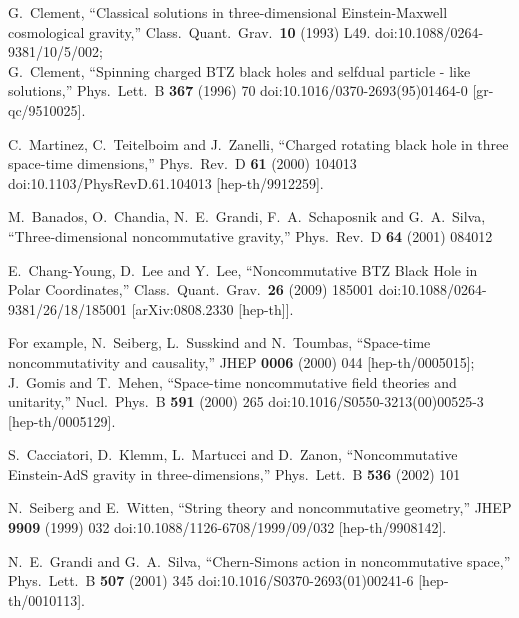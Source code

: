 \documentclass[11pt]{article}
\numberwithin{equation}{section}
\begin{document}
\begin{thebibliography}{99}
  G.~Clement,
  ``Classical solutions in three-dimensional Einstein-Maxwell cosmological gravity,''
  Class.\ Quant.\ Grav.\  {\bf 10} (1993) L49.
  doi:10.1088/0264-9381/10/5/002;\\
  G.~Clement,
  ``Spinning charged BTZ black holes and selfdual particle - like solutions,''
  Phys.\ Lett.\ B {\bf 367} (1996) 70
  doi:10.1016/0370-2693(95)01464-0
  [gr-qc/9510025].


  C.~Martinez, C.~Teitelboim and J.~Zanelli,
  ``Charged rotating black hole in three space-time dimensions,''
  Phys.\ Rev.\ D {\bf 61} (2000) 104013
  doi:10.1103/PhysRevD.61.104013
  [hep-th/9912259].

  M.~Banados, O.~Chandia, N.~E.~Grandi, F.~A.~Schaposnik and G.~A.~Silva,
  ``Three-dimensional noncommutative gravity,''
  Phys.\ Rev.\ D {\bf 64} (2001) 084012

  E.~Chang-Young, D.~Lee and Y.~Lee,
 ``Noncommutative BTZ Black Hole in Polar Coordinates,''
  Class.\ Quant.\ Grav.\  {\bf 26} (2009) 185001
  doi:10.1088/0264-9381/26/18/185001
  [arXiv:0808.2330 [hep-th]].

For example,
  N.~Seiberg, L.~Susskind and N.~Toumbas,
  ``Space-time noncommutativity and causality,''
  JHEP {\bf 0006} (2000) 044
  [hep-th/0005015];\\
  J.~Gomis and T.~Mehen,
  ``Space-time noncommutative field theories and unitarity,''
  Nucl.\ Phys.\ B {\bf 591} (2000) 265
  doi:10.1016/S0550-3213(00)00525-3
  [hep-th/0005129].


  S.~Cacciatori, D.~Klemm, L.~Martucci and D.~Zanon,
  ``Noncommutative Einstein-AdS gravity in three-dimensions,''
  Phys.\ Lett.\ B {\bf 536} (2002) 101


  N.~Seiberg and E.~Witten,
  ``String theory and noncommutative geometry,''
  JHEP {\bf 9909} (1999) 032
  doi:10.1088/1126-6708/1999/09/032
  [hep-th/9908142].

  N.~E.~Grandi and G.~A.~Silva,
  ``Chern-Simons action in noncommutative space,''
  Phys.\ Lett.\ B {\bf 507} (2001) 345
  doi:10.1016/S0370-2693(01)00241-6
  [hep-th/0010113].


\end{thebibliography}
\end{document}
